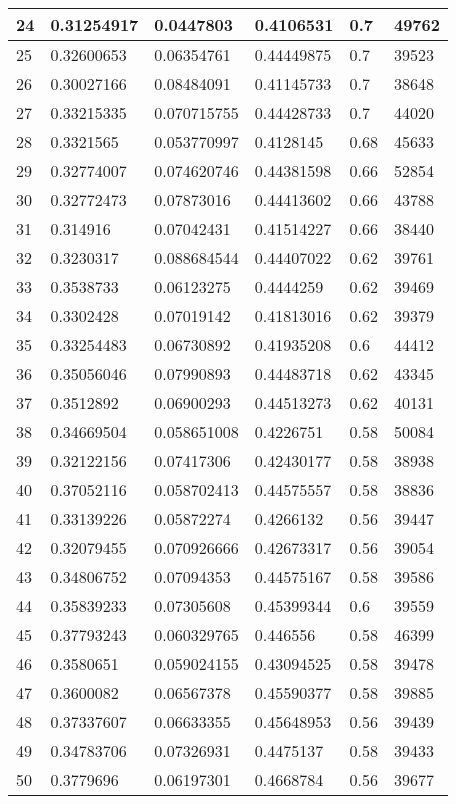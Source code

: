 \begin{longtable}{|l|l|l|l|l|l|}
24 & 0.31254917 & 0.0447803 & 0.4106531 & 0.7 & 49762 \\ \hline 
25 & 0.32600653 & 0.06354761 & 0.44449875 & 0.7 & 39523 \\ \hline 
26 & 0.30027166 & 0.08484091 & 0.41145733 & 0.7 & 38648 \\ \hline 
27 & 0.33215335 & 0.070715755 & 0.44428733 & 0.7 & 44020 \\ \hline 
28 & 0.3321565 & 0.053770997 & 0.4128145 & 0.68 & 45633 \\ \hline 
29 & 0.32774007 & 0.074620746 & 0.44381598 & 0.66 & 52854 \\ \hline 
30 & 0.32772473 & 0.07873016 & 0.44413602 & 0.66 & 43788 \\ \hline 
31 & 0.314916 & 0.07042431 & 0.41514227 & 0.66 & 38440 \\ \hline 
32 & 0.3230317 & 0.088684544 & 0.44407022 & 0.62 & 39761 \\ \hline 
33 & 0.3538733 & 0.06123275 & 0.4444259 & 0.62 & 39469 \\ \hline 
34 & 0.3302428 & 0.07019142 & 0.41813016 & 0.62 & 39379 \\ \hline 
35 & 0.33254483 & 0.06730892 & 0.41935208 & 0.6 & 44412 \\ \hline 
36 & 0.35056046 & 0.07990893 & 0.44483718 & 0.62 & 43345 \\ \hline 
37 & 0.3512892 & 0.06900293 & 0.44513273 & 0.62 & 40131 \\ \hline 
38 & 0.34669504 & 0.058651008 & 0.4226751 & 0.58 & 50084 \\ \hline 
39 & 0.32122156 & 0.07417306 & 0.42430177 & 0.58 & 38938 \\ \hline 
40 & 0.37052116 & 0.058702413 & 0.44575557 & 0.58 & 38836 \\ \hline 
41 & 0.33139226 & 0.05872274 & 0.4266132 & 0.56 & 39447 \\ \hline 
42 & 0.32079455 & 0.070926666 & 0.42673317 & 0.56 & 39054 \\ \hline 
43 & 0.34806752 & 0.07094353 & 0.44575167 & 0.58 & 39586 \\ \hline 
44 & 0.35839233 & 0.07305608 & 0.45399344 & 0.6 & 39559 \\ \hline 
45 & 0.37793243 & 0.060329765 & 0.446556 & 0.58 & 46399 \\ \hline 
46 & 0.3580651 & 0.059024155 & 0.43094525 & 0.58 & 39478 \\ \hline 
47 & 0.3600082 & 0.06567378 & 0.45590377 & 0.58 & 39885 \\ \hline 
48 & 0.37337607 & 0.06633355 & 0.45648953 & 0.56 & 39439 \\ \hline 
49 & 0.34783706 & 0.07326931 & 0.4475137 & 0.58 & 39433 \\ \hline 
50 & 0.3779696 & 0.06197301 & 0.4668784 & 0.56 & 39677 \\ \hline 
\end{longtable}